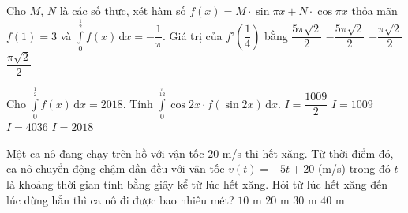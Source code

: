 \begin{ex}%
	Cho $M$, $N$ là các số thực, xét hàm số $f(x)=M\cdot\sin\pi x+N\cdot\cos\pi x$ thỏa mãn $f(1)=3$ và $\displaystyle\int\limits_0^{\tfrac{1}{2}} f(x)\mathrm{\,d}x=-\dfrac{1}{\pi}$. Giá trị của $f’\left(\dfrac{1}{4}\right)$ bằng
	\choice
	{\True $\dfrac{5\pi\sqrt{2}}{2}$}
	{$-\dfrac{5\pi\sqrt{2}}{2}$}
	{$-\dfrac{\pi\sqrt{2}}{2}$}
	{$\dfrac{\pi\sqrt{2}}{2}$}
\end{ex}
\begin{ex}%
	Cho $\displaystyle\int\limits_0^{\tfrac{1}{2}} f(x)\mathrm{\,d}x=2018$. Tính $\displaystyle\int\limits_0^{\tfrac{\pi}{12}}\cos 2x\cdot f(\sin 2x)\mathrm{\,d}x$. 
	\choice
	{$I=\dfrac{1009}{2}$}
	{\True $I=1009$}
	{$I=4036$}
	{$I=2018$}
\end{ex}
\begin{ex}%
	Một ca nô đang chạy trên hồ với vận tốc $20$ m/s thì hết xăng. Từ thời điểm đó, ca nô chuyển động chậm dần đều với vận tốc $v(t)=-5t+20$ (m/s) trong đó $t$ là khoảng thời gian tính bằng giây kể từ lúc hết xăng. Hỏi từ lúc hết xăng đến lúc dừng hẳn thì ca nô đi được bao nhiêu mét?
	\choice
	{$10$ m}
	{$20$ m}
	{$30$ m}
	{\True $40$ m}
\end{ex}
